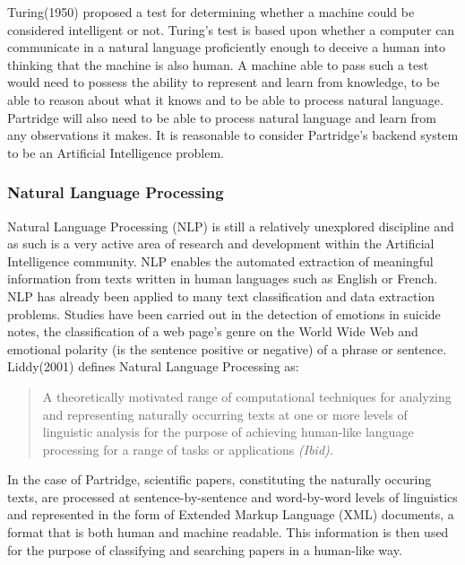 \documentclass[12pt,a4paper]{article}
\begin{document}
Turing(1950) proposed a test for determining whether a machine could be
considered intelligent or not\cite{turing1950computing}. Turing's test is based
upon whether a computer can communicate in a natural language proficiently
enough to deceive a human into thinking that the machine is also human. A
machine able to pass such a test would need to possess the ability to represent
and learn from knowledge, to be able to reason about what it knows and to be
able to process natural language\cite{russell2010artificial}. Partridge will
also need to be able to process natural language and learn from any
observations it makes. It is reasonable to consider Partridge's backend system
to be an Artificial Intelligence problem.


\subsubsection{Natural Language Processing} 

Natural Language Processing (NLP) is still a relatively unexplored discipline
and as such is a very active area of research and development within the
Artificial Intelligence community\cite{liddy2001natural}. NLP enables the
automated extraction of meaningful information from texts written in human
languages such as English or French. NLP has already been applied to many text
classification and data extraction problems. Studies have been carried out in
the detection of emotions in suicide notes\cite{citeulike:11077287}, the
classification of a web page's genre on the World Wide
Web\cite{citeulike:11288938} and emotional polarity (is the sentence positive
or negative) of a phrase or sentence\cite{Wilson05Polarity}. Liddy(2001)
defines Natural Language Processing as:

\begin{quotation} 
A theoretically motivated range of computational techniques for analyzing and
representing naturally occurring texts at one or more levels of linguistic
analysis for the purpose of achieving human-like language processing for a
range of tasks or applications \it{(Ibid)}.  
\end{quotation}

In the case of Partridge, scientific papers, constituting the naturally occuring
texts, are processed at sentence-by-sentence and word-by-word levels of
linguistics and represented in the form of Extended Markup Language (XML)
documents, a format that is both human and machine readable. This information
is then used for the purpose of classifying and searching papers in a
human-like way. 
\end{document}
